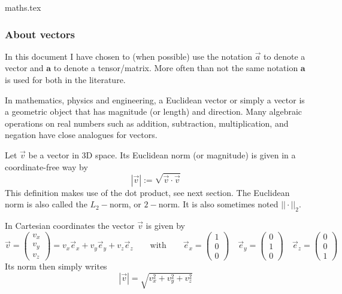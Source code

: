 \begin{flushright} {\tiny {\color{gray} maths.tex}} \end{flushright}

\subsubsection{About vectors}

\begin{remark}
In this document I have chosen to (when possible) use the notation $\vec{a}$
to denote a vector and ${\bm a}$ to denote a tensor/matrix. More often than not 
the same notation ${\bm a}$ is used for both in the literature.
\end{remark}

In mathematics, physics and engineering, a Euclidean vector or simply a vector 
is a geometric object that has magnitude (or length) and direction. 
Many algebraic operations on real numbers such as addition, subtraction, multiplication, 
and negation have close analogues for vectors.

Let $\vec{v}$ be a vector in 3D space. 
Its Euclidean norm (or magnitude) is given in a coordinate-free way by 
\[
|\vec{v}|:=\sqrt{\vec{v}\cdot\vec{v}}
\]
This definition makes use of the dot product, see next section.
The Euclidean norm is also called the $L_2-$norm, or $2-$norm. It is also 
sometimes noted $||\cdot ||_2$. 

In Cartesian coordinates the vector $\vec{v}$ is given by
\[
\vec{v}=
\left(
\begin{array}{c}
v_x \\ v_y \\ v_z
\end{array}
\right)
=
v_x \vec{e}_x + 
v_y \vec{e}_y + 
v_z \vec{e}_z 
\qquad
\text{with}
\qquad
\vec{e}_x=
\left(
\begin{array}{c}
1 \\ 0 \\ 0
\end{array}
\right)
\quad
\vec{e}_y=
\left(
\begin{array}{c}
0 \\ 1 \\ 0
\end{array}
\right)
\quad
\vec{e}_z=
\left(
\begin{array}{c}
0 \\ 0 \\ 1
\end{array}
\right)
\]
Its norm then simply writes
\[
|\vec{v}| = \sqrt{v_x^2 + v_y^2 + v_z^2}
\]


